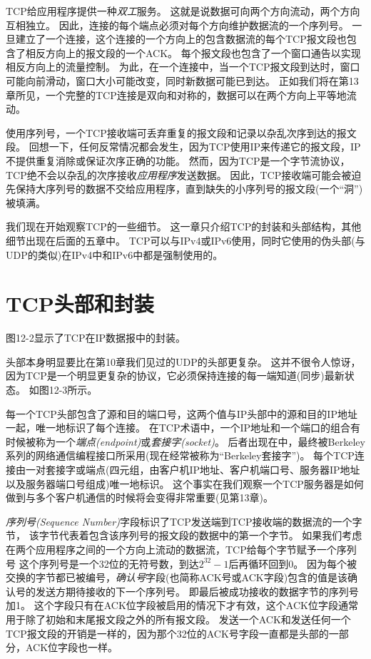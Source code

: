 \documentclass{../main.tex}{subfiles}
\begin{document}
TCP给应用程序提供一种\emph{双工}服务。
这就是说数据可向两个方向流动，两个方向互相独立。
因此，连接的每个端点必须对每个方向维护数据流的一个序列号。
一旦建立了一个连接，这个连接的一个方向上的包含数据流的每个TCP报文段也包含了相反方向上的报文段的一个ACK。
每个报文段也包含了一个窗口通告以实现相反方向上的流量控制。
为此，在一个连接中，当一个TCP报文段到达时，窗口可能向前滑动，窗口大小可能改变，同时新数据可能已到达。
正如我们将在第13章所见，一个完整的TCP连接是双向和对称的，数据可以在两个方向上平等地流动。

使用序列号，一个TCP接收端可丢弃重复的报文段和记录以杂乱次序到达的报文段。
回想一下，任何反常情况都会发生，因为TCP使用IP来传递它的报文段，IP不提供重复消除或保证次序正确的功能。
然而，因为TCP是一个字节流协议，TCP绝不会以杂乱的次序接收\emph{应用程序}发送数据。
因此，TCP接收端可能会被迫先保持大序列号的数据不交给应用程序，直到缺失的小序列号的报文段(一个``洞'')被填满。

我们现在开始观察TCP的一些细节。
这一章只介绍TCP的封装和头部结构，其他细节出现在后面的五章中。
TCP可以与IPv4或IPv6使用，同时它使用的伪头部(与UDP的类似)在IPv4中和IPv6中都是强制使用的。


\section{TCP头部和封装}
图12-2显示了TCP在IP数据报中的封装。

头部本身明显要比在第10章我们见过的UDP的头部更复杂。
这并不很令人惊讶，因为TCP是一个明显更复杂的协议，它必须保持连接的每一端知道(同步)最新状态。
如图12-3所示。

每一个TCP头部包含了源和目的端口号，这两个值与IP头部中的源和目的IP地址一起，唯一地标识了每个连接。
在TCP术语中，一个IP地址和一个端口的组合有时候被称为一个\emph{端点(endpoint)}或\emph{套接字(socket)}。
后者出现在\cite{1981Transmission}中，最终被Berkeley系列的网络通信编程接口所采用(现在经常被称为``Berkeley套接字'')。
每个TCP连接由一对套接字或端点(四元组，由客户机IP地址、客户机端口号、服务器IP地址以及服务器端口号组成)唯一地标识。
这个事实在我们观察一个TCP服务器是如何做到与多个客户机通信的时候将会变得非常重要(见第13章)。

\emph{序列号(Sequence Number)}字段标识了TCP发送端到TCP接收端的数据流的一个字节，
    该字节代表着包含该序列号的报文段的数据中的第一个字节。
如果我们考虑在两个应用程序之间的一个方向上流动的数据流，TCP给每个字节赋予一个序列号
这个序列号是一个32位的无符号数，到达$2^{32}-1$后再循环回到0。
因为每个被交换的字节都已被编号，\emph{确认号}字段(也简称ACK号或ACK字段)包含的值是该确认号的发送方期待接收的下一个序列号。
即最后被成功接收的数据字节的序列号加1。
这个字段只有在ACK位字段被启用的情况下才有效，这个ACK位字段通常用于除了初始和末尾报文段之外的所有报文段。
发送一个ACK和发送任何一个TCP报文段的开销是一样的，因为那个32位的ACK号字段一直都是头部的一部分，ACK位字段也一样。
\end{document}
